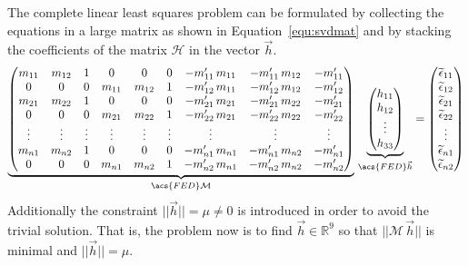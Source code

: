 \documentclass[12pt,a4paper,oneside,openright]{book}
\newcommand{\Ie}{That is, }
\newcommand{\equ}[1]{Equation~\ref{equ:#1}}
\begin{document}
\begin{CJK}{UTF8}{}
The complete linear least squares problem can be formulated by collecting the equations in a large matrix as shown in \equ{svdmat} and by stacking the coefficients of the matrix $\mathcal{H}$ in the vector $\vec{h}$.
\begin{equation}\label{equ:svdmat}
  \underbrace{\begin{pmatrix}
      m_{11}&m_{12}&1&0&0&0&-m^\prime_{11}\,m_{11}&-m^\prime_{11}\,m_{12}&-m^\prime_{11}\\
      0&0&0&m_{11}&m_{12}&1&-m^\prime_{12}\,m_{11}&-m^\prime_{12}\,m_{12}&-m^\prime_{12}\\
      m_{21}&m_{22}&1&0&0&0&-m^\prime_{21}\,m_{21}&-m^\prime_{21}\,m_{22}&-m^\prime_{21}\\
      0&0&0&m_{21}&m_{22}&1&-m^\prime_{22}\,m_{21}&-m^\prime_{22}\,m_{22}&-m^\prime_{22}\\
      \vdots&\vdots&\vdots&\vdots&\vdots&\vdots&\vdots&\vdots&\vdots\\
      m_{n1}&m_{n2}&1&0&0&0&-m^\prime_{n1}\,m_{n1}&-m^\prime_{n1}\,m_{n2}&-m^\prime_{n1}\\
      0&0&0&m_{n1}&m_{n2}&1&-m^\prime_{n2}\,m_{n1}&-m^\prime_{n2}\,m_{n2}&-m^\prime_{n2}
    \end{pmatrix}}_{\acs{FED}\mathcal{M}}\,
  \underbrace{\begin{pmatrix}h_{11}\\h_{12}\\\vdots\\h_{33}\end{pmatrix}}_{\acs{FED}\vec{h}}=
  \begin{pmatrix}\widetilde{\epsilon}_{11}\\\widetilde{\epsilon}_{12}\\\widetilde{\epsilon}_{21}\\\widetilde{\epsilon}_{22}\\
    \vdots\\\widetilde{\epsilon}_{n1}\\\widetilde{\epsilon}_{n2}\end{pmatrix}
\end{equation}
Additionally the constraint $||\vec{h}||=\mu\neq 0$ is introduced in order to avoid the trivial solution. \Ie the problem now is to find $\vec{h}\in\mathbb{R}^9$ so that $||\mathcal{M}\,\vec{h}||$ is minimal and $||\vec{h}||=\mu$.


\end{CJK}
\end{document}
